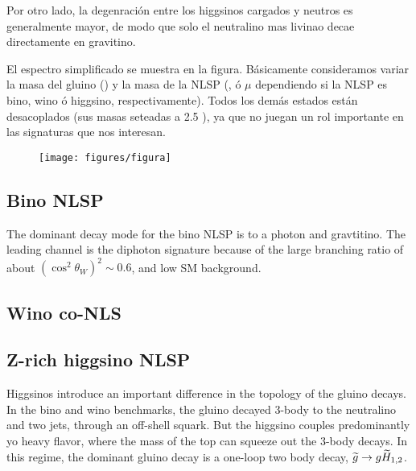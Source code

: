 Por otro lado, la degenraci\'on entre los higgsinos cargados y neutros es generalmente mayor, de modo
que solo el neutralino mas livinao decae directamente en gravitino.

El espectro simplificado se muestra en la figura. Básicamente consideramos variar
la masa del gluino () y la masa de la NLSP (,  ó $\mu$ dependiendo
si la NLSP es bino, wino ó higgsino, respectivamente). Todos los demás estados
están desacoplados (sus masas seteadas a 2.5 \tev), ya que no juegan un rol importante
en las signaturas que nos interesan.

\begin{figure}[h]
  \centering
  \texttt{[image: figures/figura]}
\end{figure}



\subsection{Bino NLSP}

The dominant decay mode for the bino NLSP is to a photon and gravtitino. The leading channel is the diphoton signature because of the large branching ratio of about $(\cos^2\theta_W)^2 \sim 0.6$,
and low SM background.

\subsection{Wino co-NLS}

\subsection{Z-rich higgsino NLSP}

Higgsinos introduce  an important difference in the topology of the gluino decays. In the bino and wino benchmarks, the gluino decayed 3-body to the neutralino and two jets,
through an off-shell squark. But the higgsino couples predominantly yo heavy flavor, where the mass of the top can squeeze out the 3-body decays. In this regime, the dominant gluino decay is
a one-loop two body decay, $\widetilde{g}\rightarrow g\widetilde{H}_{1,2}$.


